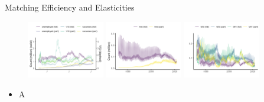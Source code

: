 \documentclass[aspectratio=169]{beamer}
\begin{document}
\begin{frame}{Matching Efficiency and Elasticities}
    \begin{figure}[!ht]
  \begin{center}
  \includegraphics[width = 0.3\textwidth]
  {figuretable/unemployed_vacancy_month_full_time_part_time.png}
  \includegraphics[width = 0.3\textwidth]
  {figuretable/hire_month_full_time_part_time.png}
  \includegraphics[width = 0.3\textwidth]
  {figuretable/job_finding_rate_worker_finding_rate_month_full_time_part_time.png}
  \end{center}
  \footnotesize
\end{figure} 
\begin{itemize}
    \item A
\end{itemize}

\end{frame}
\end{document}

